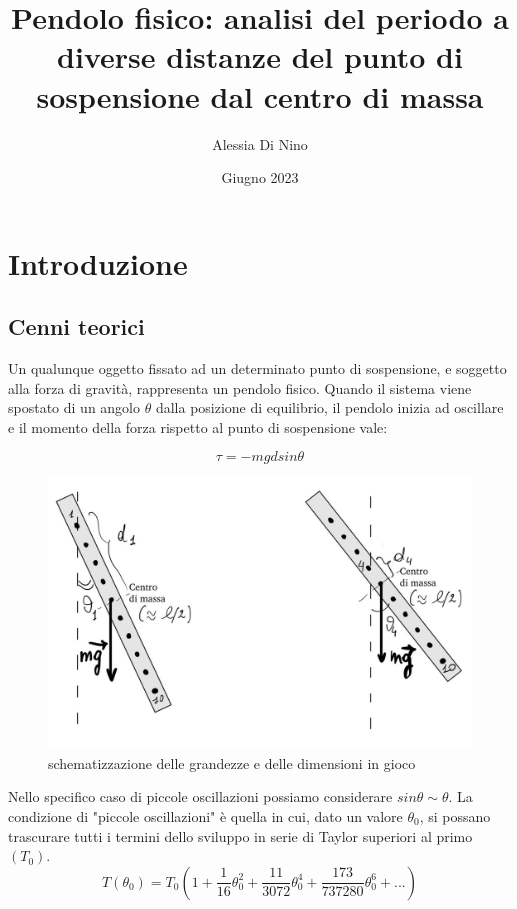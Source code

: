 \documentclass{article}
\begin{document}
\title{Pendolo fisico: analisi del periodo a diverse distanze del punto di sospensione dal centro di massa}
\author{Alessia Di Nino}
\date{Giugno 2023}
\maketitle

\section{Introduzione}

\subsection{Cenni teorici} 
Un qualunque oggetto fissato ad un determinato punto di sospensione, e soggetto alla forza di gravità, rappresenta un pendolo fisico. Quando il sistema viene spostato di un angolo $\theta$ dalla posizione di equilibrio, il pendolo inizia ad oscillare e il momento della forza rispetto al punto di sospensione vale: 

\begin{equation}
\label{eq:1}
    \tau = -mgdsin\theta
\end{equation}

\begin{figure} [h]
    \centering
    \includegraphics[width=15cm]{schema.jpg}
    \caption{schematizzazione delle grandezze e delle dimensioni in gioco}
    \label{fig:my_label}
\end{figure}

\FloatBarrier

Nello specifico caso di piccole oscillazioni possiamo considerare $sin\theta \sim \theta$. La condizione di "piccole oscillazioni" è quella in cui, dato un valore $\theta_0$,  si possano trascurare tutti i termini dello sviluppo in serie di Taylor superiori al primo $(T_0)$. 
\begin{equation}
    T(\theta_0) = T_0(1 + \frac{1}{16}\theta_0 ^2 + \frac{11}{3072} \theta_0 ^4 + \frac{173}{737280} \theta_0 ^6 + ...)
\end{equation}
\end{document}

